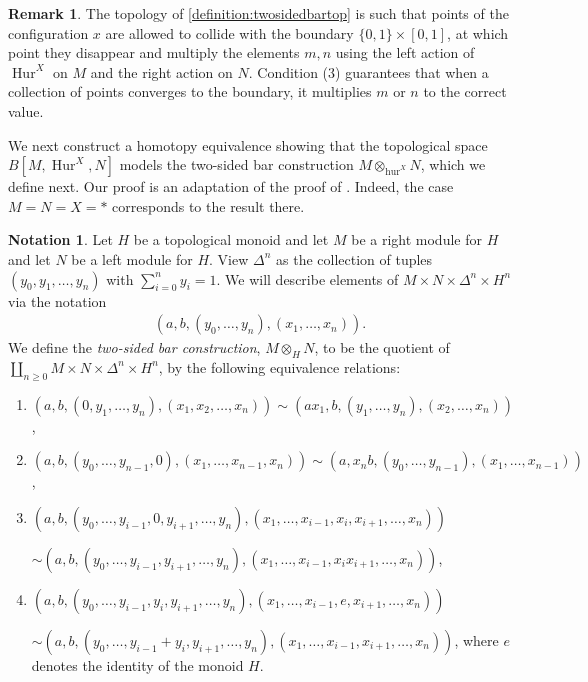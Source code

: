 \documentclass[12 pt]{amsart}
\theoremstyle{plain}
\theoremstyle{definition}
\newtheorem{remark}[theorem]{Remark}
\newtheorem{notation}[theorem]{Notation}
\theoremstyle{remark}
\numberwithin{equation}{section}
\DeclareMathOperator\Hur{Hur}
\begin{document}
\begin{remark}
	\label{remark:b-hur-topology}
	The topology of \autoref{definition:twosidedbartop} is such that points of
	the configuration $x$ are allowed to collide with the boundary
	$\{0,1\}\times [0,1]$, at which point they disappear and  multiply the
	elements $m,n$ using the left action of $\Hur^X$ on $M$ and the right
	action on $N$. Condition (3) guarantees that when a collection of points converges to the boundary, it multiplies $m$ or $n$ to the correct value.
\end{remark}

We next construct a homotopy equivalence showing that the topological space $B[M,\Hur^X,N]$ models the two-sided bar construction
$M\otimes_{\operatorname{hur}^{X}}N$, which we define next. Our proof is an adaptation of the proof of \cite[Theorem 5.2.3]{bergstromDPW:hyperelliptic-curves-the-scanning-map}. Indeed, the case $M=N=X=*$ corresponds to the result there.

\begin{notation}
	\label{definition:two-sided-bar}
	Let $H$ be a topological monoid
	and let $M$ be a right module for $H$ and let $N$ be
	a left module for $H$.
	View $\Delta^n$ as the collection of tuples $(y_0,y_1,\ldots,y_n)$
	with $\sum_{i=0}^n y_i=1$. 
	We will describe elements of
	$M \times N \times \Delta^n \times H^n$ via the notation
	\begin{align}
		\label{equation:bar-data}
		(a, b, (y_0,\ldots, y_n), (x_1, \ldots, x_n)).
	\end{align}
	We define the {\em two-sided bar construction}, 
	$M\otimes_{H}N$, to be the quotient of $\coprod_{n \geq 0} M \times N
	\times \Delta^n \times H^n$,
	by the following
	equivalence relations: 
	\begin{enumerate}
		\item $(a, b, (0, y_1, \ldots, y_n), (x_1, x_2,\ldots, x_n))
		\sim (ax_1, b, (y_1,\ldots, y_n), (x_2, \ldots,
		x_n))$,
		\item $(a, b, (y_0,\ldots, y_{n-1},0), (x_1, \ldots, x_{n-1},x_n)) \sim (a,
		x_n b, (y_0,\ldots, y_{n-1}), (x_1, \ldots,
		x_{n-1}))$,
		\item $(a, b, (y_0,\ldots, y_{i-1},0,y_{i+1},\ldots, y_n), (x_1,
		\ldots, x_{i-1},x_i,x_{i+1},\ldots, x_n))$
		
		$\sim
		(a, b, (y_0,\ldots,y_{i-1},y_{i+1},\ldots, y_n), (x_1,
		\ldots, x_{i-1},x_i x_{i+1}, \ldots, x_n))$,
		\item $(a, b, (y_0,\ldots, y_{i-1},y_i,y_{i+1},\ldots, y_n), (x_1,
		\ldots, x_{i-1},e,x_{i+1},\ldots, x_n))$
		
		$\sim
		(a, b, (y_0,\ldots,y_{i-1}+y_i,y_{i+1},\ldots, y_n), (x_1,
		\ldots, x_{i-1},x_{i+1}, \ldots, x_n))$,
		where $e$ denotes the identity of the monoid $H$.
	\end{enumerate}
\end{notation}
\end{document}
